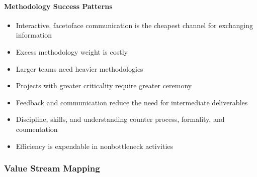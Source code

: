 \documentclass[letterpaper,10pt,english]{jupyterBook}
\begin{document}
\paragraph{Methodology Success Patterns}
\label{\detokenize{APM/agile:methodology-success-patterns}}\begin{itemize}
\item {} 
\sphinxAtStartPar
Interactive, face\sphinxhyphen{}to\sphinxhyphen{}face communication is the cheapest channel for exchanging information

\item {} 
\sphinxAtStartPar
Excess methodology weight is costly

\item {} 
\sphinxAtStartPar
Larger teams need heavier methodologies

\item {} 
\sphinxAtStartPar
Projects with greater criticality require greater ceremony

\item {} 
\sphinxAtStartPar
Feedback and communication reduce the need for intermediate deliverables

\item {} 
\sphinxAtStartPar
Discipline, skills, and understanding counter process, formality, and coumentation

\item {} 
\sphinxAtStartPar
Efficiency is expendable in nonbottleneck activities

\end{itemize}


\subsubsection{Value Stream Mapping}
\label{\detokenize{APM/agile:value-stream-mapping}}
\end{document}
